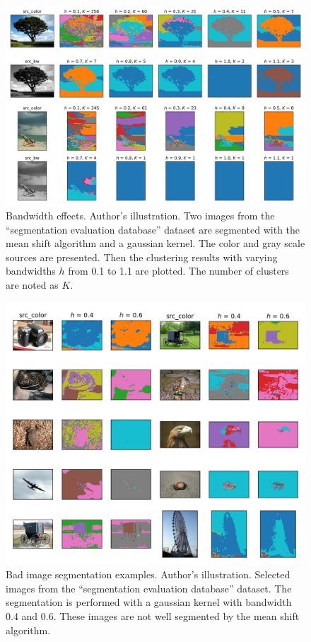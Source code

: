 \documentclass{article}
\begin{document}
\begin{figure}
	\centering
	\includegraphics[width=\textwidth]{figures/segmentation-results-bandwidth-effects.png}
	\caption[Bandwidth effects]{Bandwidth effects. Author's illustration. Two images from the ``segmentation evaluation database'' dataset are segmented with the mean shift algorithm and a gaussian kernel. The color and gray scale sources are presented. Then the clustering results with varying bandwidths $h$ from 0.1 to 1.1 are plotted. The number of clusters are noted as $K$.}
	\label{fig:segmentation-results-bandwidth-effects}
\end{figure}

\begin{figure}
	\centering
	\includegraphics[width=\textwidth]{figures/segmentation-results-bad-examples.png}
	\caption[Bad image segmentation examples]{Bad image segmentation examples. Author's illustration. Selected images from the ``segmentation evaluation database'' dataset. The segmentation is performed with a gaussian kernel with bandwidth 0.4 and 0.6. These images are not well segmented by the mean shift algorithm.}
	\label{fig:segmentation-results-bad-examples}
\end{figure}
\end{document}
